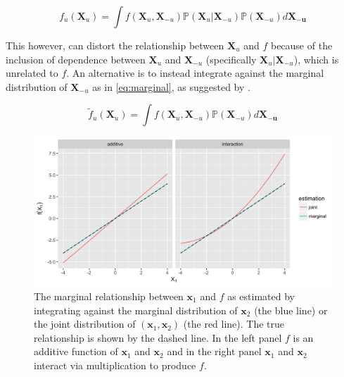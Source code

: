 $$f_u (\mathbf{X}_u) = \int f(\mathbf{X}_u, \mathbf{X}_{-u}) \mathbb{P}(\mathbf{X}_u | \mathbf{X}_{-u}) \mathbb{P}(\mathbf{X}_{-u}) d \mathbf{X_{-u}} \label{eq:joint}$$

This however, can distort the relationship between $\mathbf{X}_u$ and $f$ because of the inclusion of dependence between $\mathbf{X}_u$ and $\mathbf{X}_{-u}$ (specifically $\mathbf{X}_u | \mathbf{X}_{-u}$), which is unrelated to $f$. An alternative is to instead integrate against the marginal distribution of $\mathbf{X}_{-u}$ as in \ref{eq:marginal}, as suggested by \citep{friedman2001greedy}.

$$\tilde{f}_u (\mathbf{X}_u) = \int f(\mathbf{X}_u, \mathbf{X}_{-u}) \mathbb{P}(\mathbf{X}_{-u}) d \mathbf{X_{-u}}  \label{eq:marginal}$$

\begin{figure}[h!]
  \includegraphics[width=\textwidth]{mvj.png}
  \caption{The marginal relationship between $\mathbf{x}_1$ and $f$ as estimated by integrating against the marginal distribution of $\mathbf{x}_2$ (the blue line) or the joint distribution of $(\mathbf{x}_1, \mathbf{x}_2)$ (the red line). The true relationship is shown by the dashed line. In the left panel $f$ is an additive function of $\mathbf{x}_1$ and $\mathbf{x}_2$ and in the right panel $\mathbf{x}_1$ and $\mathbf{x}_2$ interact via multiplication to produce $f$. \label{fig:sim}}
\end{figure}

